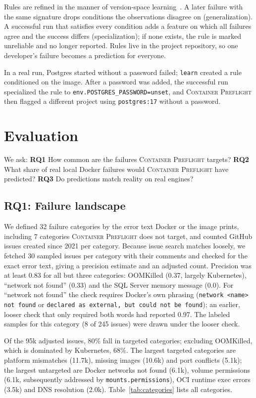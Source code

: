 \documentclass[preprint,12pt]{elsarticle}
\newcommand{\tool}{\textsc{Container Preflight}}
\begin{document}
Rules are refined in the manner of version-space learning~\cite{mitchell1982generalization}. A later failure with the same signature drops conditions the observations disagree on (generalization). A successful run that satisfies every condition adds a feature on which all failures agree and the success differs (specialization); if none exists, the rule is marked unreliable and no longer reported. Rules live in the project repository, so one developer's failure becomes a prediction for everyone.

In a real run, Postgres started without a password failed; \texttt{learn} created a rule conditioned on the image. After a password was added, the successful run specialized the rule to \texttt{env.POSTGRES\_PASSWORD=unset}, and \tool{} then flagged a different project using \texttt{postgres:17} without a password.

\section{Evaluation}
\label{sec:eval}

We ask:
\textbf{RQ1} How common are the failures \tool{} targets?
\textbf{RQ2} What share of real local Docker failures would \tool{} have predicted?
\textbf{RQ3} Do predictions match reality on real engines?

\subsection{RQ1: Failure landscape}
We defined 32 failure categories by the error text Docker or the image prints, including 7 categories \tool{} does not target, and counted GitHub issues created since 2021 per category. Because issue search matches loosely, we fetched 30 sampled issues per category with their comments and checked for the exact error text, giving a precision estimate and an adjusted count. Precision was at least 0.83 for all but three categories: OOMKilled (0.37, largely Kubernetes), ``network not found'' (0.33) and the SQL Server memory message (0.0). For ``network not found'' the check requires Docker's own phrasing (\texttt{network <name> not found} or \texttt{declared as external, but could not be found}); an earlier, looser check that only required both words had reported 0.97. The labeled samples for this category (8 of 245 issues) were drawn under the looser check.

Of the 95k adjusted issues, 80\% fall in targeted categories; excluding OOMKilled, which is dominated by Kubernetes, 68\%. The largest targeted categories are platform mismatches (11.7k), missing images (10.6k) and port conflicts (5.1k); the largest untargeted are Docker networks not found (6.1k), volume permissions (6.1k, subsequently addressed by \texttt{mounts.permissions}), OCI runtime exec errors (3.5k) and DNS resolution (2.0k). Table~\ref{tab:categories} lists all categories.
\end{document}

